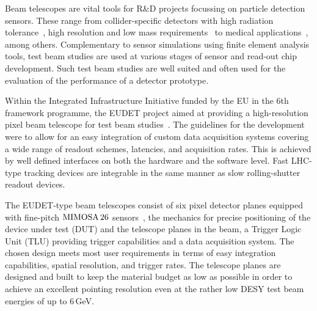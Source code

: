 
Beam telescopes are vital tools for R\&D projects focussing on particle detection sensors. 
These range from collider-specific detectors with high radiation tolerance~\cite{1748-0221-9-12-C12001,1748-0221-9-12-C12029},
 high resolution and low mass requirements~\cite{1748-0221-10-03-C03044} to medical applications~\cite{Ballabriga2011S15}, among others. 
Complementary to sensor simulations using finite element analysis tools, test beam studies are used at various stages of sensor and read-out chip development. 
Such test beam studies are well suited and often used for the evaluation of the performance of a detector prototype. %

Within the Integrated Infrastructure Initiative funded by the EU in the 6th framework programme,
 the EUDET project aimed at providing a high-resolution pixel beam telescope for test beam studies~\cite{ref:eudetreport200902}.
The guidelines for the development were to allow for an easy integration of custom data acquisition systems covering a wide range of readout schemes, latencies, and acquisition rates.
This is achieved by well defined interfaces on both the hardware and the software level. 
Fast LHC-type tracking devices are integrable in the same manner as slow rolling-shutter readout devices. 

The EUDET-type beam telescopes consist of six pixel detector planes equipped with fine-pitch $\textrm{MIMOSA\,26}$ sensors~\cite{HuGuo2010480},
 the mechanics for precise positioning of the device under test (DUT) and the telescope planes in the beam, a Trigger Logic Unit (TLU) providing trigger capabilities and a data acquisition system.
The chosen design meets most user requirements in terms of easy integration capabilities, spatial resolution, and trigger rates. 
The telescope planes are designed and built to keep the material budget as low as possible in order to achieve an excellent pointing resolution
 even at the rather low DESY test beam energies of up to 6\,GeV.

